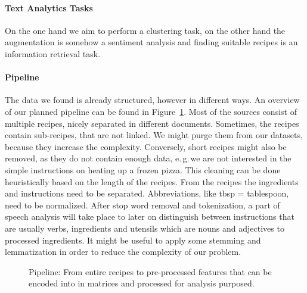 \documentclass[
     12pt,         %
     a4paper,      %
     BCOR10mm,     %
     DIV14,        %
     ]{article}
\begin{document}
\paragraph{Text Analytics Tasks} On the one hand we aim to perform a clustering task, on the other hand the augmentation is somehow a sentiment analysis and finding suitable recipes is an information retrieval task. %

\paragraph{Pipeline} The data we found is already structured, however in different ways. An overview of our planned pipeline can be found in Figure~\ref{fig:pipeline}. Most of the sources consist of multiple recipes, nicely separated in different documents.
Sometimes, the recipes contain sub-recipes, that are not linked. We might purge them from our datasets, because they increase the complexity. Conversely, short recipes 
might also be removed, as they do not contain enough data, e.\,g.\,we are not interested in the simple instructions on heating up a frozen pizza.
This cleaning can be done heuristically based on the length of the recipes. From the recipes the ingredients and instructions need to be separated. Abbreviations, like tbsp = tablespoon, need to be normalized.
After stop word removal and tokenization, a part of speech analysis will take place to later on distinguish between instructions that are usually verbs, ingredients and utensils which are nouns and adjectives to processed ingredients.
It might be useful to apply some stemming and lemmatization in order to reduce the complexity of our problem. 


\begin{figure}[t!]
  \centering

  \caption{Pipeline: From entire recipes to pre-processed features that can be encoded into in matrices and processed for analysis purposed.}
  \label{fig:pipeline}
\end{figure}
\end{document}
